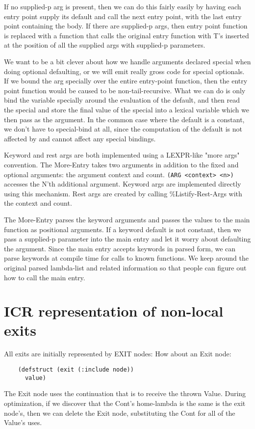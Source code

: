 If no supplied-p arg is present, then we can do this fairly easily by having
each entry point supply its default and call the next entry point, with the
last entry point containing the body.  If there are supplied-p args, then entry
point function is replaced with a function that calls the original entry
function with T's inserted at the position of all the supplied args with
supplied-p parameters.

We want to be a bit clever about how we handle arguments declared special when
doing optional defaulting, or we will emit really gross code for special
optionals.  If we bound the arg specially over the entire entry-point function,
then the entry point function would be caused to be non-tail-recursive.  What
we can do is only bind the variable specially around the evaluation of the
default, and then read the special and store the final value of the special
into a lexical variable which we then pass as the argument.  In the common case
where the default is a constant, we don't have to special-bind at all, since
the computation of the default is not affected by and cannot affect any special
bindings.

Keyword and rest args are both implemented using a LEXPR-like "more
args" convention.  The More-Entry takes two arguments in addition to
the fixed and optional arguments: the argument context and count.
\verb+(ARG <context> <n>)+ accesses the N'th additional argument.  Keyword
args are implemented directly using this mechanism.  Rest args are
created by calling \%Listify-Rest-Args with the context and count.

The More-Entry parses the keyword arguments and passes the values to the main
function as positional arguments.  If a keyword default is not constant, then
we pass a supplied-p parameter into the main entry and let it worry about
defaulting the argument.  Since the main entry accepts keywords in parsed form,
we can parse keywords at compile time for calls to known functions.  We keep
around the original parsed lambda-list and related information so that people
can figure out how to call the main entry.


\section{ICR representation of non-local exits}

All exits are initially represented by EXIT nodes:
How about an Exit node:
\begin{verbatim}
    (defstruct (exit (:include node))
      value)
\end{verbatim}
The Exit node uses the continuation that is to receive the thrown Value.
During optimization, if we discover that the Cont's home-lambda is the same is
the exit node's, then we can delete the Exit node, substituting the Cont for
all of the Value's uses.

